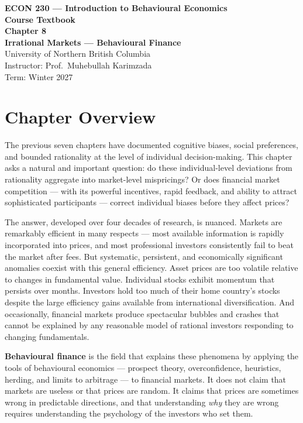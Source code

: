 \documentclass[12pt, letterpaper]{article}
\begin{document}
\begin{titlepage}
\centering\vspace*{3cm}
{\Large\bfseries\color{econblue} ECON 230 --- Introduction to Behavioural Economics\\[1em]}
{\large\bfseries Course Textbook\\[2em]}
{\LARGE\bfseries\color{econblue} Chapter 8\\[0.5em]}
{\Large\bfseries Irrational Markets --- Behavioural Finance\\[2em]}
\vfill
{\normalsize University of Northern British Columbia\\
Instructor: Prof.\ Muhebullah Karimzada\\
Term: Winter 2027}
\end{titlepage}
\tableofcontents
\newpage


\medskip


\section*{Chapter Overview}


The previous seven chapters have documented cognitive biases, social preferences, and bounded rationality at the level of individual decision-making. This chapter asks a natural and important question: do these individual-level deviations from rationality aggregate into market-level mispricings? Or does financial market competition --- with its powerful incentives, rapid feedback, and ability to attract sophisticated participants --- correct individual biases before they affect prices?

The answer, developed over four decades of research, is nuanced. Markets are remarkably efficient in many respects --- most available information is rapidly incorporated into prices, and most professional investors consistently fail to beat the market after fees. But systematic, persistent, and economically significant anomalies coexist with this general efficiency. Asset prices are too volatile relative to changes in fundamental value. Individual stocks exhibit momentum that persists over months. Investors hold too much of their home country's stocks despite the large efficiency gains available from international diversification. And occasionally, financial markets produce spectacular bubbles and crashes that cannot be explained by any reasonable model of rational investors responding to changing fundamentals.

\textbf{Behavioural finance} is the field that explains these phenomena by applying the tools of behavioural economics --- prospect theory, overconfidence, heuristics, herding, and limits to arbitrage --- to financial markets. It does not claim that markets are useless or that prices are random. It claims that prices are sometimes wrong in predictable directions, and that understanding \textit{why} they are wrong requires understanding the psychology of the investors who set them.
\end{document}
